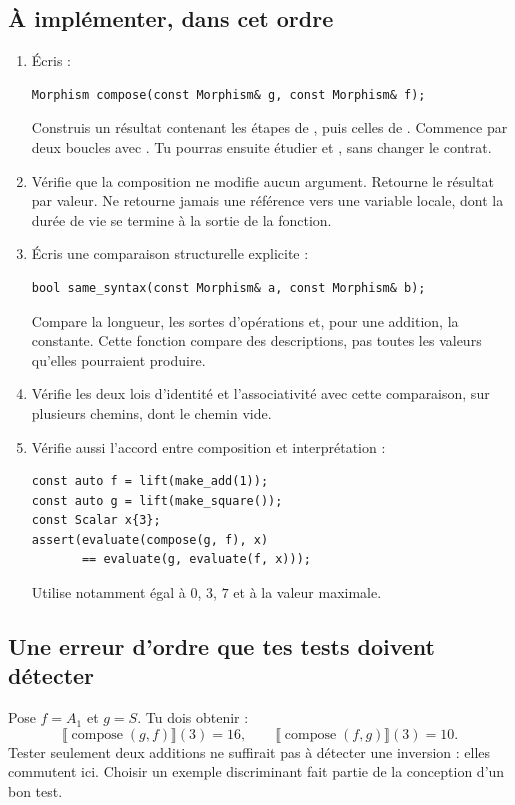 \documentclass[11pt,a4paper]{article}
\newcommand{\code}[1]{\texttt{\detokenize{#1}}}
\newcommand{\sem}[1]{\llbracket #1\rrbracket}
\begin{document}
\subsection{À implémenter, dans cet ordre}
\begin{enumerate}
\item Écris :
\begin{lstlisting}
Morphism compose(const Morphism& g, const Morphism& f);
\end{lstlisting}
Construis un résultat contenant les étapes de \code{f}, puis celles de
\code{g}. Commence par deux boucles avec \code{push_back}. Tu pourras
ensuite étudier \code{insert} et \code{reserve}, sans changer le contrat.
\item Vérifie que la composition ne modifie aucun argument.
Retourne le résultat par valeur. Ne retourne jamais une référence vers une
variable locale, dont la durée de vie se termine à la sortie de la fonction.
\item Écris une comparaison structurelle explicite :
\begin{lstlisting}
bool same_syntax(const Morphism& a, const Morphism& b);
\end{lstlisting}
Compare la longueur, les sortes d'opérations et, pour une addition, la
constante. Cette fonction compare des descriptions, pas toutes les valeurs
qu'elles pourraient produire.
\item Vérifie les deux lois d'identité et l'associativité avec cette
comparaison, sur plusieurs chemins, dont le chemin vide.
\item Vérifie aussi l'accord entre composition et interprétation :
\begin{lstlisting}
const auto f = lift(make_add(1));
const auto g = lift(make_square());
const Scalar x{3};
assert(evaluate(compose(g, f), x)
       == evaluate(g, evaluate(f, x)));
\end{lstlisting}
Utilise notamment \code{x} égal à \(0\), \(3\), \(7\) et à la valeur maximale.
\end{enumerate}

\subsection{Une erreur d'ordre que tes tests doivent détecter}
Pose \(f=A_1\) et \(g=S\). Tu dois obtenir :
\[
\sem{\operatorname{compose}(g,f)}(3)=16,
\qquad
\sem{\operatorname{compose}(f,g)}(3)=10.
\]
Tester seulement deux additions ne suffirait pas à détecter une inversion :
elles commutent ici. Choisir un exemple discriminant fait partie de la
conception d'un bon test.
\end{document}
